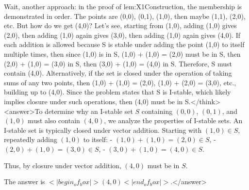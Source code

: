 Wait, another approach: in the proof of lem:X1Construction, the membership is demonstrated in order. The points are (0,0), (0,1), (1,0), then maybe (1,1), (2,0), etc. But how do we get (4,0)? Let's see, starting from (1,0), adding (1,0) gives (2,0), then adding (1,0) again gives (3,0), then adding (1,0) again gives (4,0). If each addition is allowed because S is stable under adding the point (1,0) to itself multiple times, then since (1,0) is in S, (1,0) + (1,0) = (2,0) must be in S, then (2,0) + (1,0) = (3,0) in S, then (3,0) + (1,0) = (4,0) in S. Therefore, S must contain (4,0). Alternatively, if the set is closed under the operation of taking sums of any two points, then (1,0) + (1,0) = (2,0), (1,0) + (2,0) = (3,0), etc., building up to (4,0). Since the problem states that S is I-stable, which likely implies closure under such operations, then (4,0) must be in S.</think><answer>To determine why an I-stable set \( S \) containing \((0,0)\), \((0,1)\), and \((1,0)\) must also contain \((4,0)\), we analyze the properties of I-stable sets. An I-stable set is typically closed under vector addition. Starting with \((1,0) \in S\), repeatedly adding \((1,0)\) to itself:  
- \((1,0) + (1,0) = (2,0) \in S\),  
- \((2,0) + (1,0) = (3,0) \in S\),  
- \((3,0) + (1,0) = (4,0) \in S\).  

Thus, by closure under vector addition, \((4,0)\) must be in \( S \).  

The answer is \(<|begin_of_box|>(4,0)<|end_of_box|>\).</answer>